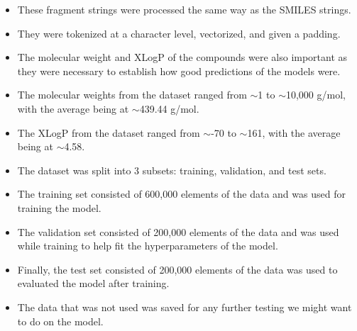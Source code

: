 \begin{itemize}
            \item These fragment strings were processed the same way as the SMILES strings.
            \item They were tokenized at a character level, vectorized, and given a padding.
            \item The molecular weight and XLogP of the compounds were also important as they were necessary to establish how good predictions of the models were.
            \item The molecular weights from the dataset ranged from $\sim$1 to $\sim$10,000 g/mol, with the average being at $\sim$439.44 g/mol.
            \item The XLogP from the dataset ranged from $\sim$-70 to $\sim$161, with the average being at $\sim$4.58.
            \item The dataset was split into 3 subsets: training, validation, and test sets. 
            \item The training set consisted of 600,000 elements of the data and was used for training the model.
            \item The validation set consisted of 200,000 elements of the data and was used while training to help fit the hyperparameters of the model.
            \item Finally, the test set consisted of 200,000 elements of the data was used to evaluated the model after training.
            \item The data that was not used was saved for any further testing we might want to do on the model.
        \end{itemize}
    

